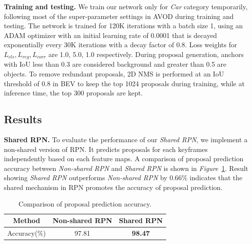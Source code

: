 \documentclass[a4paper, 10pt, conference]{ieeeconf}      %
\def\figurename{\emph{Figure}}
\begin{document}
\textbf{Training and testing.} We train our network only for \textit{Car} category temporarily, following most of the super-parameter settings in AVOD \cite{ku2018joint} during training and testing. The network is trained for 120K iterations with a batch size 1, using an ADAM \cite{kingma2014adam} optimizer with an initial learning rate of 0.0001 that is decayed exponentially every 30K iterations with a decay factor of 0.8. Loss weights for $L_{cls}, L_{reg}, L_{corr}$ are 1.0, 5.0, 1.0 respectively. During proposal generation, anchors with IoU less than 0.3 are considered background and greater than 0.5 are objects. To remove redundant proposals, 2D NMS is performed at an IoU threshold of 0.8 in BEV to keep the top 1024 proposals during training, while at inference time, the top 300 proposals are kept.

\subsection{Results}
\textbf{Shared RPN.} To evaluate the performance of our \textit{Shared RPN}, we implement a non-shared version of RPN. It predicts proposals for each keyframes independently based on each feature maps. A comparison of proposal prediction accuracy between \textit{Non-shared RPN} and \textit{Shared RPN} is shown in \figurename \, \ref{table:rpn_result}. Result showing \textit{Shared RPN} outperforms \textit{Non-shared RPN} by 0.66\% indicates that the shared mechanism in RPN promotes the accuracy of proposal prediction. 
\begin{table}[h]\centering
	\vspace{-0.3cm}
		\begin{tabular}{ccc}
			\toprule[1pt]
			Method        & Non-shared RPN & Shared RPN  \\ \midrule
			Accuracy(\%)  & 97.81      & \textbf{98.47}       \\
			\bottomrule[1pt]
	\end{tabular}
	\caption{Comparison of proposal prediction accuracy.}
	\label{table:rpn_result}
	\vspace{-0.2cm}
\end{table}
\end{document}
